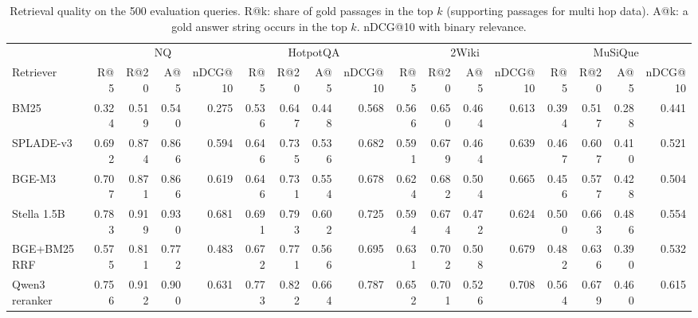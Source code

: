 \begin{table}[t]
\centering
\caption{Retrieval quality on the 500 evaluation queries. R@k: share of gold passages in the top $k$ (supporting passages for multi hop data). A@k: a gold answer string occurs in the top $k$. nDCG@10 with binary relevance.}
\label{tab:retrieval}
\scriptsize
\setlength{\tabcolsep}{2.5pt}
\begin{tabular}{lrrrrrrrrrrrrrrrr}
\toprule
 & \multicolumn{4}{c}{NQ} & \multicolumn{4}{c}{HotpotQA} & \multicolumn{4}{c}{2Wiki} & \multicolumn{4}{c}{MuSiQue} \\
\cmidrule(lr){2-5} \cmidrule(lr){6-9} \cmidrule(lr){10-13} \cmidrule(lr){14-17}
Retriever & R@5 & R@20 & A@5 & nDCG@10 & R@5 & R@20 & A@5 & nDCG@10 & R@5 & R@20 & A@5 & nDCG@10 & R@5 & R@20 & A@5 & nDCG@10 \\
\midrule
BM25 & 0.324 & 0.519 & 0.540 & 0.275 & 0.536 & 0.647 & 0.448 & 0.568 & 0.566 & 0.650 & 0.464 & 0.613 & 0.394 & 0.517 & 0.288 & 0.441 \\
SPLADE-v3 & 0.692 & 0.874 & 0.866 & 0.594 & 0.646 & 0.735 & 0.536 & 0.682 & 0.591 & 0.679 & 0.464 & 0.639 & 0.467 & 0.607 & 0.410 & 0.521 \\
BGE-M3 & 0.707 & 0.871 & 0.866 & 0.619 & 0.646 & 0.731 & 0.554 & 0.678 & 0.624 & 0.682 & 0.504 & 0.665 & 0.456 & 0.577 & 0.428 & 0.504 \\
Stella 1.5B & 0.783 & 0.919 & 0.930 & 0.681 & 0.691 & 0.793 & 0.602 & 0.725 & 0.594 & 0.674 & 0.472 & 0.624 & 0.500 & 0.663 & 0.486 & 0.554 \\
BGE+BM25 RRF & 0.575 & 0.811 & 0.772 & 0.483 & 0.672 & 0.771 & 0.566 & 0.695 & 0.631 & 0.702 & 0.508 & 0.679 & 0.482 & 0.636 & 0.390 & 0.532 \\
Qwen3 reranker & 0.756 & 0.912 & 0.900 & 0.631 & 0.773 & 0.822 & 0.664 & 0.787 & 0.652 & 0.701 & 0.526 & 0.708 & 0.564 & 0.679 & 0.460 & 0.615 \\
\bottomrule
\end{tabular}
\end{table}